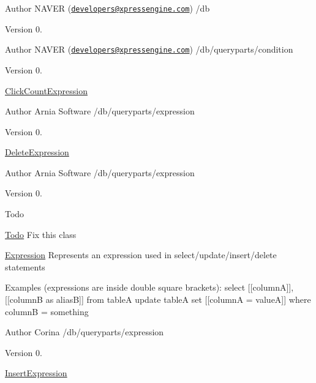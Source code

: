 \begin{DoxyAuthor}{Author}
N\-A\-V\-E\-R (\href{mailto:developers@xpressengine.com}{\tt developers@xpressengine.\-com}) /db 
\end{DoxyAuthor}
\begin{DoxyVersion}{Version}
0.
\end{DoxyVersion}
\begin{DoxyAuthor}{Author}
N\-A\-V\-E\-R (\href{mailto:developers@xpressengine.com}{\tt developers@xpressengine.\-com}) /db/queryparts/condition 
\end{DoxyAuthor}
\begin{DoxyVersion}{Version}
0.
\end{DoxyVersion}
\hyperlink{classClickCountExpression}{Click\-Count\-Expression} \begin{DoxyAuthor}{Author}
Arnia Software /db/queryparts/expression 
\end{DoxyAuthor}
\begin{DoxyVersion}{Version}
0.
\end{DoxyVersion}
\hyperlink{classDeleteExpression}{Delete\-Expression}

\begin{DoxyAuthor}{Author}
Arnia Software /db/queryparts/expression 
\end{DoxyAuthor}
\begin{DoxyVersion}{Version}
0. 
\end{DoxyVersion}
\begin{DoxyRefDesc}{Todo}
\item[\hyperlink{todo__todo000003}{Todo}]Fix this class \end{DoxyRefDesc}


\hyperlink{classExpression}{Expression} Represents an expression used in select/update/insert/delete statements

Examples (expressions are inside double square brackets)\-: select \mbox{[}\mbox{[}column\-A\mbox{]}\mbox{]}, \mbox{[}\mbox{[}column\-B as alias\-B\mbox{]}\mbox{]} from table\-A update table\-A set \mbox{[}\mbox{[}column\-A = value\-A\mbox{]}\mbox{]} where column\-B = something

\begin{DoxyAuthor}{Author}
Corina /db/queryparts/expression 
\end{DoxyAuthor}
\begin{DoxyVersion}{Version}
0.
\end{DoxyVersion}
\hyperlink{classInsertExpression}{Insert\-Expression}

